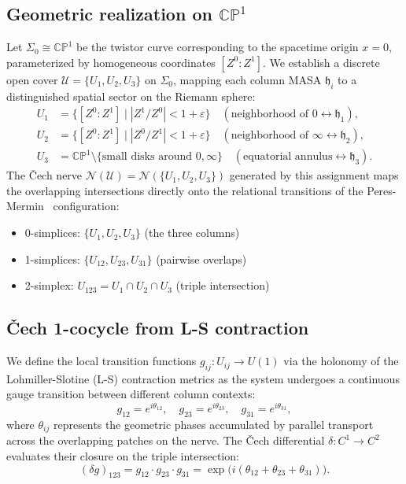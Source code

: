 \documentclass[11pt,a4paper]{article}
\theoremstyle{remark}
\newcommand{\CP}{\mathbb{CP}}
\newcommand{\cN}{\mathcal{N}}
\newcommand{\cU}{\mathcal{U}}
\begin{document}
\subsection{Geometric realization on $\CP^1$}

Let $\Sigma_0 \cong \CP^1$ be the twistor curve corresponding to
the spacetime origin $x = 0$, parameterized by homogeneous coordinates
$[Z^0 : Z^1]$. We establish a discrete open cover
$\cU = \{U_1, U_2, U_3\}$ on $\Sigma_0$, mapping each column MASA
$\mathfrak{h}_i$ to a distinguished spatial sector on the Riemann
sphere:
\begin{align*}
  U_1 &= \{[Z^0:Z^1] \mid |Z^1/Z^0| < 1 + \varepsilon\}
    \quad (\text{neighborhood of } 0 \leftrightarrow \mathfrak{h}_1),\\
  U_2 &= \{[Z^0:Z^1] \mid |Z^0/Z^1| < 1 + \varepsilon\}
    \quad (\text{neighborhood of } \infty \leftrightarrow \mathfrak{h}_2),\\
  U_3 &= \CP^1 \setminus \{\text{small disks around } 0, \infty\}
    \quad (\text{equatorial annulus} \leftrightarrow \mathfrak{h}_3).
\end{align*}
The \v{C}ech nerve $\cN(\cU) = \cN(\{U_1, U_2, U_3\})$ generated
by this assignment maps the overlapping intersections directly onto
the relational transitions of the Peres-Mermin~\cite{PeresMermin} configuration:
\begin{itemize}
  \item 0-simplices: $\{U_1, U_2, U_3\}$ (the three columns)
  \item 1-simplices: $\{U_{12}, U_{23}, U_{31}\}$ (pairwise overlaps)
  \item 2-simplex: $U_{123} = U_1 \cap U_2 \cap U_3$ (triple intersection)
\end{itemize}

\subsection{\v{C}ech 1-cocycle from L-S contraction}

We define the local transition functions $g_{ij}: U_{ij} \to U(1)$
via the holonomy of the Lohmiller-Slotine (L-S) contraction metrics
as the system undergoes a continuous gauge transition between
different column contexts:
\[
  g_{12} = e^{i\theta_{12}},\quad
  g_{23} = e^{i\theta_{23}},\quad
  g_{31} = e^{i\theta_{31}},
\]
where $\theta_{ij}$ represents the geometric phases accumulated by
parallel transport across the overlapping patches on the nerve.
The \v{C}ech differential $\delta: C^1 \to C^2$ evaluates their
closure on the triple intersection:
\[
  (\delta g)_{123}
    = g_{12} \cdot g_{23} \cdot g_{31}
    = \exp\!\big(i(\theta_{12} + \theta_{23} + \theta_{31})\big).
\]
\end{document}
